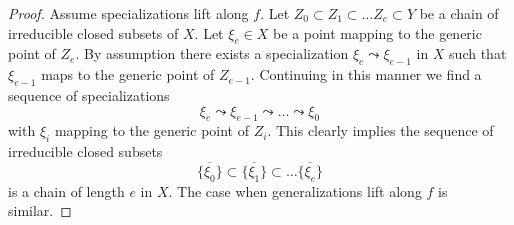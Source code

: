 \documentclass[10pt,a4paper]{amsart}
\theoremstyle{plain}
\theoremstyle{definition}
\theoremstyle{remark}
\numberwithin{equation}{subsection}
\begin{document}
\begin{proof}
Assume specializations lift along $f$.
Let $Z_0 \subset Z_1 \subset \ldots Z_e \subset Y$ be a chain
of irreducible closed subsets of $X$. Let $\xi_e \in X$ be a point
mapping to the generic point of $Z_e$. By assumption there
exists a specialization
$\xi_e \leadsto \xi_{e - 1}$ in $X$ such that $\xi_{e - 1}$ maps to
the generic point of $Z_{e - 1}$. Continuing in this manner we find
a sequence of specializations
$$
\xi_e \leadsto \xi_{e - 1} \leadsto \ldots \leadsto \xi_0
$$
with $\xi_i$ mapping to the generic point of $Z_i$.
This clearly implies the sequence of irreducible closed
subsets
$$
\overline{\{\xi_0\}} \subset
\overline{\{\xi_1\}} \subset \ldots
\overline{\{\xi_e\}}
$$
is a chain of length $e$ in $X$.
The case when generalizations lift along $f$ is similar.
\end{proof}
\end{document}
